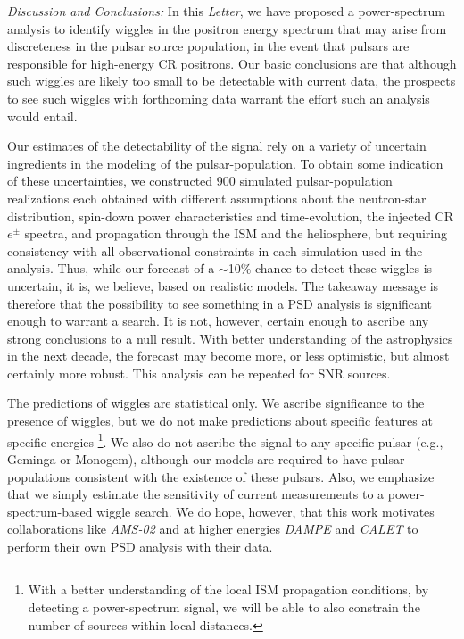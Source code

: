 \documentclass[aps,prd,twocolumn,amsmath,superscriptaddress,amssymb,showpacs,floatfix,nofootinbib]{revtex4-1}
\begin{document}
\textit{Discussion and Conclusions:} In this \emph{Letter}, we
have proposed a power-spectrum analysis to identify wiggles in
the positron energy spectrum that may arise from discreteness in
the pulsar source population, in the event that pulsars are
responsible for high-energy CR positrons.  Our basic conclusions
are that although such wiggles are likely too small to be
detectable with current data, the prospects to see such wiggles
with forthcoming data warrant the effort such
an analysis would entail.

Our estimates of the detectability of the signal rely on a
variety of uncertain ingredients in the modeling of the 
pulsar-population.  To obtain some indication of these uncertainties,
we constructed 900 simulated pulsar-population realizations
each obtained with different assumptions about the neutron-star
distribution, spin-down power characteristics and
time-evolution, the injected CR $e^{\pm}$ spectra, and propagation  
through the ISM and the heliosphere, but requiring consistency
with all observational constraints in each simulation used in
the analysis.  Thus, while our forecast of a $\sim$10$\%$ chance
to detect these wiggles is uncertain, it is, we believe, based
on realistic models.  The takeaway message is therefore that the
possibility to see something in a PSD analysis is significant
enough to warrant a search.  It is not, however, certain enough
to ascribe any strong conclusions to a null result.  With better
understanding of the astrophysics in the next decade, the
forecast may become more, or less optimistic, but almost
certainly more robust. This analysis can be repeated for SNR
sources. 

The predictions of wiggles are statistical only.  We ascribe
significance to the presence of wiggles, but we do not make
predictions about specific features at specific energies 
\footnote{With a better understanding of the local ISM propagation 
conditions, by detecting   a power-spectrum signal, we will be able 
to also constrain the number of sources within local distances.}.  We
also do not ascribe the signal to any specific pulsar
(e.g., Geminga or Monogem), although our models are required to
have pulsar-populations consistent with the existence of these pulsars.  
Also, we emphasize that we simply estimate the sensitivity of current 
measurements to a power-spectrum-based wiggle search.  We do 
hope, however, that this work motivates collaborations like 
\textit{AMS-02} and at higher energies \textit{DAMPE} and 
\textit{CALET} to perform their own PSD analysis with their data.
 
\end{document}
